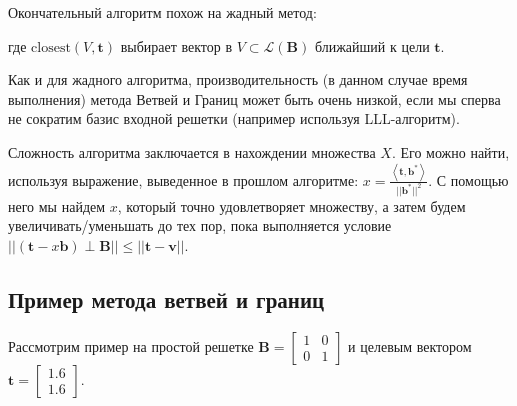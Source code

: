 Окончательный алгоритм похож на жадный метод:

\begin{algorithmic}

\end{algorithmic}

где $ \text{closest}(V, \mathbf{t}) $ выбирает вектор в $ V \subset \mathcal{L}(\mathbf{B}) $ ближайший к цели $ \mathbf{t} $.  

Как и для жадного алгоритма, производительность (в данном случае время выполнения) метода Ветвей и Границ может быть очень низкой, если мы сперва не сократим базис входной решетки (например используя LLL-алгоритм).

Сложность алгоритма заключается в нахождении множества $ X $. Его можно найти, используя выражение, выведенное в прошлом алгоритме: $ x = \frac{\left\langle \mathbf{t},\mathbf{b}^* \right\rangle}{||\mathbf{b}^*||^2} $. С помощью него мы найдем $ x $, который точно удовлетворяет множеству, а затем будем увеличивать/уменьшать до тех пор, пока выполняется условие $ || (\mathbf{t} - x\mathbf{b}) \perp \mathbf{B} || \leq || \mathbf{t} - \mathbf{v} || $.

\subsection{Пример метода ветвей и границ}

Рассмотрим пример на простой решетке $ \mathbf{B} = \left[\begin{array}{cccc}
1 & 0 \\
0 & 1
\end{array}\right] $ и целевым вектором $ \mathbf{t} = \left[\begin{array}{cccc}
1.6 \\
1.6
\end{array}\right] $.

